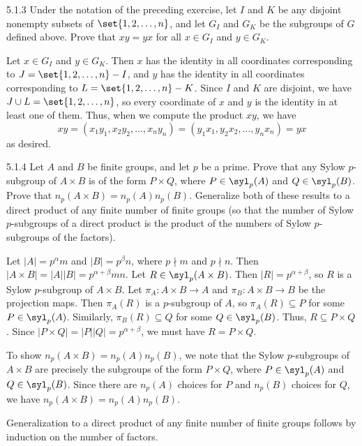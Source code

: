\begin{exercise}{5.1.3}
    Under the notation of the preceding exercise, let $I$ and $K$ be any disjoint nonempty subsets of $\set{1, 2, \ldots, n}$, and let $G_I$ and $G_K$ be the subgroups of $G$ defined above.
	Prove that $xy = yx$ for all $x \in G_I$ and $y \in G_K$.
\end{exercise}

\begin{sol}
    Let $x \in G_I$ and $y \in G_K$.
	Then $x$ has the identity in all coordinates corresponding to $J = \set{1, 2, \ldots, n} - I$, and $y$ has the identity in all coordinates corresponding to $L = \set{1, 2, \ldots, n} - K$.
	Since $I$ and $K$ are disjoint, we have $J \cup L = \set{1, 2, \ldots, n}$, so every coordinate of $x$ and $y$ is the identity in at least one of them.
	Thus, when we compute the product $xy$, we have
    \[
    	xy = (x_1y_1, x_2y_2, \ldots, x_ny_n) = (y_1x_1, y_2x_2, \ldots, y_nx_n) = yx
    \]
    as desired.
\end{sol}

\begin{exercise}{5.1.4}
    Let $A$ and $B$ be finite groups, and let $p$ be a prime.
	Prove that any Sylow $p$-subgroup of $A \times B$ is of the form $P \times Q$, where $P \in \syl_p(A)$ and $Q \in \syl_p(B)$.
	Prove that $n_p(A \times B) = n_p(A)n_p(B)$.
	Generalize both of these results to a direct product of any finite number of finite groups (so that the number of Sylow $p$-subgroups of a direct product is the product of the numbers of Sylow $p$-subgroups of the factors).
\end{exercise}

\begin{sol}
    Let $|A| = p^\alpha m$ and $|B| = p^\beta n$, where $p \nmid m$ and $p \nmid n$.
	Then $|A \times B| = |A||B| = p^{\alpha + \beta}mn$.
	Let $R \in \syl_p(A \times B)$.
	Then $|R| = p^{\alpha + \beta}$, so $R$ is a Sylow $p$-subgroup of $A \times B$.
	Let $\pi_A : A \times B \to A$ and $\pi_B : A \times B \to B$ be the projection maps.
	Then $\pi_A(R)$ is a $p$-subgroup of $A$, so $\pi_A(R) \subseteq P$ for some $P \in \syl_p(A)$.
	Similarly, $\pi_B(R) \subseteq Q$ for some $Q \in \syl_p(B)$.
	Thus, $R \subseteq P \times Q$.
	Since $|P \times Q| = |P||Q| = p^{\alpha + \beta}$, we must have $R = P \times Q$.

    To show $n_p(A \times B) = n_p(A)n_p(B)$, we note that the Sylow $p$-subgroups of $A \times B$ are precisely the subgroups of the form $P \times Q$, where $P \in \syl_p(A)$ and $Q \in \syl_p(B)$.
	Since there are $n_p(A)$ choices for $P$ and $n_p(B)$ choices for $Q$, we have $n_p(A \times B) = n_p(A)n_p(B)$.

	Generalization to a direct product of any finite number of finite groups follows by induction on the number of factors.
\end{sol}

